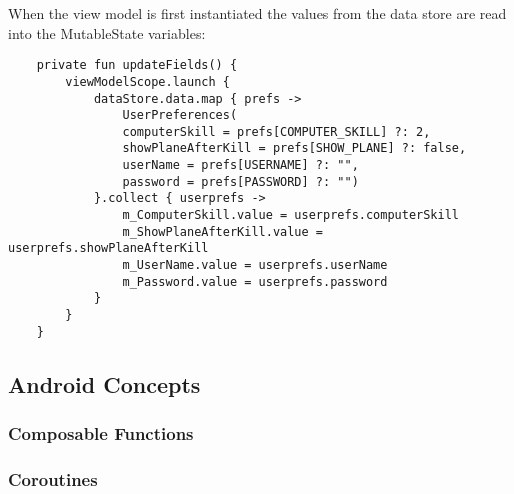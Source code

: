 When the view model is first instantiated the values from the data store are read into the MutableState variables:

\begin{lstlisting}
	private fun updateFields() {
		viewModelScope.launch {
			dataStore.data.map { prefs ->
				UserPreferences(
				computerSkill = prefs[COMPUTER_SKILL] ?: 2,
				showPlaneAfterKill = prefs[SHOW_PLANE] ?: false,
				userName = prefs[USERNAME] ?: "",
				password = prefs[PASSWORD] ?: "")
			}.collect { userprefs ->
				m_ComputerSkill.value = userprefs.computerSkill
				m_ShowPlaneAfterKill.value = userprefs.showPlaneAfterKill
				m_UserName.value = userprefs.userName
				m_Password.value = userprefs.password
			}	
		}
	}
\end{lstlisting}

\subsection { Android Concepts }

\subsubsection { Composable Functions }
\subsubsection { Coroutines }